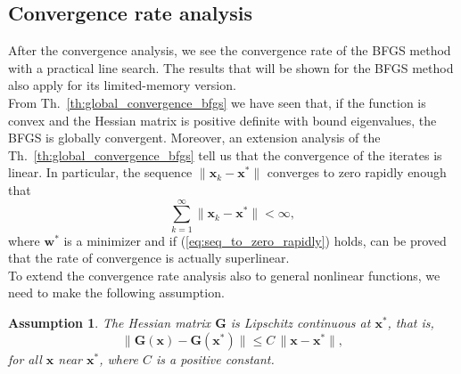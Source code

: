 \documentclass[11pt]{article}
\newtheorem{assumption}[theorem]{Assumption}
\begin{document}
\subsection{Convergence rate analysis}\label{superlinear_convergence_qn}


After the convergence analysis, we see the convergence rate of the BFGS method with a practical line search. The results that will be shown for the BFGS method also apply for its limited-memory version.\\

From Th.~\ref{th:global_convergence_bfgs} we have seen that, if the function is convex and the Hessian matrix is positive definite with bound eigenvalues, the BFGS is globally convergent. Moreover, an extension analysis of the Th.~\ref{th:global_convergence_bfgs} tell us that the convergence of the iterates is linear. In particular, the sequence $\| \mathbf{x}_k - \mathbf{x}^*\|$ converges to zero rapidly enough that
\begin{equation}\label{eq:seq_to_zero_rapidly}
    \sum_{k=1}^{\infty} \| \mathbf{x}_k - \mathbf{x}^*\| < \infty,
\end{equation}
where $\mathbf{w}^*$ is a minimizer and if (\ref{eq:seq_to_zero_rapidly}) holds, can be proved that the rate of convergence is actually superlinear.\\

To extend the convergence rate analysis also to general nonlinear functions, we need to make the following assumption.
\begin{assumption}
\label{as:7}
The Hessian matrix $\mathbf{G}$ is Lipschitz continuous at $\mathbf{x}^*$, that is,
\begin{equation}\label{eq:hessian_Lcontinuity}
    \| \mathbf{G}(\mathbf{x}) - \mathbf{G}(\mathbf{x}^*) \| \leq C\,\|\mathbf{x} - \mathbf{x}^*\|,
\end{equation}
for all $\mathbf{x}$ near $\mathbf{x}^*$, where $C$ is a positive constant. 
\end{assumption}
\end{document}
